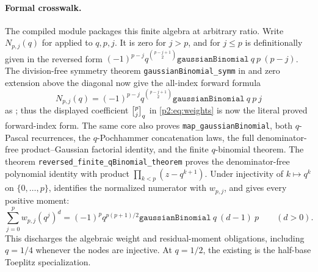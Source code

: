 \documentclass[11pt,oneside]{article}
\numberwithin{equation}{section}
\theoremstyle{definition}
\theoremstyle{remark}
\begin{document}
\paragraph{Formal crosswalk.}
The compiled module  packages this
finite algebra at arbitrary ratio.  Write \(N_{p,j}(q)\) for
 applied to \(q,p,j\).  It is zero for \(j>p\), and for
\(j\le p\) is definitionally given in the reversed form
\( (-1)^{p-j}q^{\binom{p-j+1}{2}}
\texttt{gaussianBinomial}\ q\ p\ (p-j)\).
The division-free symmetry theorem
\texttt{gaussianBinomial\_symm} in  and
zero extension above the diagonal now give the all-index forward formula
\[
 N_{p,j}(q)
 =(-1)^{p-j}q^{\binom{p-j+1}{2}}
   \texttt{gaussianBinomial}\ q\ p\ j
\]
as ; thus the
displayed coefficient \(\qbinom{p}{j}{q}\) in \eqref{p2:eq:weights} is now
the literal proved forward-index form.  The same core also proves
\texttt{map\_gaussianBinomial}, both \(q\)-Pascal recurrences, the
\(q\)-Pochhammer concatenation laws, the full denominator-free
product--Gaussian factorial identity, and the finite \(q\)-binomial theorem.
The theorem \texttt{reversed\_finite\_qBinomial\_theorem} proves the
denominator-free polynomial identity with product
\(\prod_{k<p}(z-q^{k+1})\).  Under injectivity of \(k\mapsto q^k\) on
\(\{0,\ldots,p\}\),
 identifies
the normalized numerator with \(w_{p,j}\), and
gives every positive moment:
\[
 \sum_{j=0}^{p}w_{p,j}(q^j)^d
 =(-1)^p q^{p(p+1)/2}
   \texttt{gaussianBinomial}\ q\ (d-1)\ p
 \qquad(d>0).
\]
This discharges the algebraic weight and residual-moment obligations,
including \(q=1/4\) whenever the nodes are injective.  At \(q=1/2\), the existing
 is the half-base
Toeplitz specialization.
\end{document}
